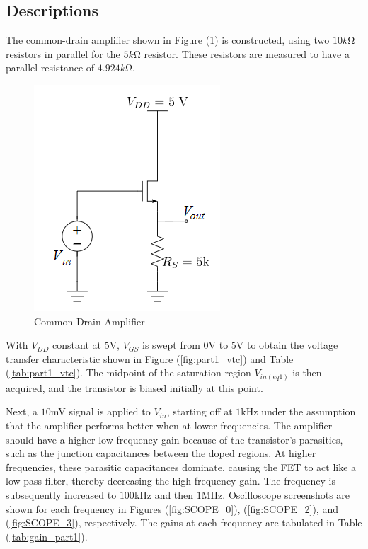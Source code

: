 \subsection{Descriptions}
The common-drain amplifier shown in Figure (\ref{fig:circuit_1}) is constructed, using two $10k$\si{\ohm} resistors in parallel for the $5k$\si{\ohm} resistor.
These resistors are measured to have a parallel resistance of $4.924k$\si{\ohm}.

\FloatBarrier

\begin{figure}[h!]
	\centering
	\includegraphics[scale=0.45]{./images/circuit_1.PNG}
	\caption{Common-Drain Amplifier}
	\label{fig:circuit_1}
\end{figure}

\FloatBarrier

With $V_{DD}$ constant at $5$\si{\volt}, $V_{GS}$ is swept from $0$\si{\volt} to $5$\si{\volt} to obtain the voltage transfer characteristic shown in Figure (\ref{fig:part1_vtc}) and Table (\ref{tab:part1_vtc}).
The midpoint of the saturation region $V_{in(eq1)}$ is then acquired, and the transistor is biased initially at this point.

Next, a $10$\si{\milli\volt} signal is applied to $V_{in}$, starting off at $1$\si{\kilo\hertz} under the assumption that the amplifier performs better when at lower frequencies. The amplifier should have a higher low-frequency gain because of the transistor's parasitics, such as the junction capacitances between the doped regions. At higher frequencies, these parasitic capacitances dominate, causing the FET to act like a low-pass filter, thereby decreasing the high-frequency gain.
The frequency is subsequently increased to $100$\si{\kilo\hertz} and then $1$\si{\mega\hertz}. Oscilloscope screenshots are shown for each frequency in Figures (\ref{fig:SCOPE_0}), (\ref{fig:SCOPE_2}), and (\ref{fig:SCOPE_3}), respectively.
The gains at each frequency are tabulated in Table (\ref{tab:gain_part1}).

